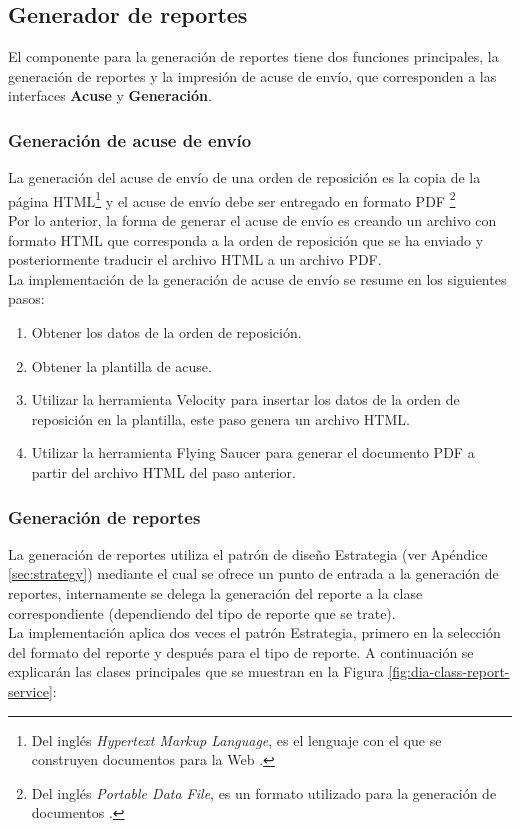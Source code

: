\subsection{Generador de reportes}
El componente para la generación de reportes tiene dos funciones principales, la generación de reportes y la impresión de acuse de envío, que corresponden a las interfaces \textbf{Acuse} y \textbf{Generación}.

\subsubsection{Generación de acuse de envío}\label{sec:gen-acuse}
La generación del acuse de envío de una orden de reposición es la copia de la página HTML\footnote{Del inglés \textit{Hypertext Markup Language}, es el lenguaje con el que se construyen documentos para la Web \cite{HTMLCSSCompleteReference}.} y el acuse de envío debe ser entregado en formato PDF \footnote{Del inglés \textit{Portable Data File}, es un formato utilizado para la generación de documentos \cite{iTextInAction}.}\\
Por lo anterior, la forma de generar el acuse de envío es creando un archivo con formato HTML que corresponda a la orden de reposición que se ha enviado y posteriormente traducir el archivo HTML a un archivo PDF.\\
La implementación de la generación de acuse de envío se resume en los siguientes pasos:
\begin{enumerate}
	\item Obtener los datos de la orden de reposición.
	\item Obtener la plantilla de acuse.
	\item Utilizar la herramienta Velocity para insertar los datos de la orden de reposición en la plantilla, este paso genera un archivo HTML.
	\item Utilizar la herramienta Flying Saucer para generar el documento PDF a partir del archivo HTML del paso anterior.
\end{enumerate}

\subsubsection{Generación de reportes}\label{sec:gen-repport}
La generación de reportes utiliza el patrón de diseño Estrategia (ver Apéndice \ref{sec:strategy}) mediante el cual se ofrece un punto de entrada a la generación de reportes, internamente se delega la generación del reporte a la clase correspondiente (dependiendo del tipo de reporte que se trate).\\
La implementación aplica dos veces el patrón Estrategia, primero en la selección del formato del reporte y después para el tipo de reporte. A continuación se explicarán las clases principales que se muestran en la Figura \ref{fig:dia-class-report-service}:


